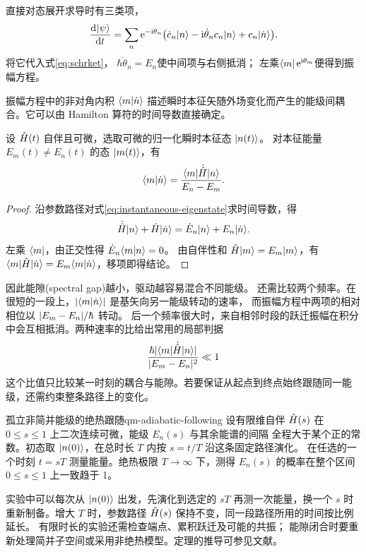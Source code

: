 直接对态展开求导时有三类项，
\[
    \frac{\mathop{}\!\mathrm{d}^{}\lvert\psi\rangle}{\mathrm{d}{t}^{}}
    = \sum_n\mathop{}\!\mathrm{e}^{-\mathrm{i}\theta_n}
    \bigl(\dot c_n\lvert n\rangle - \mathrm{i}\dot\theta_n c_n\lvert n\rangle + c_n\lvert\dot n\rangle\bigr).
\]
将它代入式\eqref{eq:schrket}，
$\hbar\dot\theta_n = E_n$使中间项与右侧抵消；
左乘$\langle m\rvert\mathop{}\!\mathrm{e}^{\mathrm{i}\theta_m}$便得到振幅方程。

振幅方程中的非对角内积 $\langle m\vert\dot n\rangle$ 描述瞬时本征矢随外场变化而产生的能级间耦合。它可以由 Hamilton 算符的时间导数直接确定。
\begin{lemma}[不同能级之间的导数耦合]
    设 $\hat{H}(t)$ 自伴且可微，选取可微的归一化瞬时本征态 $\lvert n(t)\rangle$。
    对本征能量 $E_m(t) \ne E_n(t)$ 的态 $\lvert m(t)\rangle$，有
    \begin{equation}
        \langle m\vert\dot n\rangle = \frac{\langle m\vert\dot{\hat{H}}\vert n\rangle}{E_n - E_m}.
    \end{equation}
\end{lemma}
\begin{proof}
    沿参数路径对式\eqref{eq:instantaneous-eigenstate}求时间导数，得
    \[
        \dot{\hat{H}}\lvert n\rangle + \hat{H}\lvert\dot n\rangle
            = \dot E_n\lvert n\rangle + E_n\lvert\dot n\rangle.
    \]
    左乘 $\langle m\rvert$，由正交性得 $\dot E_n\langle m\vert n\rangle = 0$。
    由自伴性和 $\hat{H}\lvert m\rangle = E_m\lvert m\rangle$，有 $\langle m\vert\hat{H}\vert\dot n\rangle = E_m\langle m\vert\dot n\rangle$，移项即得结论。
\end{proof}

因此能隙(spectral gap)越小，驱动越容易混合不同能级。
还需比较两个频率。在很短的一段上，$\lvert\langle m\vert\dot n\rangle\rvert$ 是基矢向另一能级转动的速率，
而振幅方程中两项的相对相位以 $\lvert E_m - E_n\rvert/\hbar$ 转动。
后一个频率很大时，来自相邻时段的跃迁振幅在积分中会互相抵消。两种速率的比给出常用的局部判据
\begin{equation}
    \frac{\hbar\lvert\langle m\vert\dot{\hat{H}}\vert n\rangle\rvert}{\lvert E_m - E_n\rvert^2} \ll 1
    \label{eq:adiabaticcriterion}
\end{equation}
这个比值只比较某一时刻的耦合与能隙。若要保证从起点到终点始终跟随同一能级，还需约束整条路径上的变化。
\begin{theorem}{孤立非简并能级的绝热跟随}{qm-adiabatic-following}
    设有限维自伴 $\hat{H}(s)$ 在 $0 \le s \le 1$ 上二次连续可微，能级 $E_n(s)$ 与其余能谱的间隔
    全程大于某个正的常数。初态取 $\lvert n(0)\rangle$，在总时长 $T$ 内按 $s = t/T$ 沿这条固定路径演化。
    在任选的一个时刻 $t = sT$ 测量能量。绝热极限 $T \to \infty$ 下，测得 $E_n(s)$ 的概率在整个区间 $0 \le s \le 1$ 上一致趋于 1。
\end{theorem}
实验中可以每次从 $\lvert n(0)\rangle$ 出发，先演化到选定的 $sT$ 再测一次能量，换一个 $s$ 时重新制备。增大 $T$ 时，参数路径 $\hat{H}(s)$ 保持不变，同一段路径所用的时间按比例延长。
有限时长的实验还需检查端点、累积跃迁及可能的共振；
能隙闭合时要重新处理简并子空间或采用非绝热模型。定理的推导可参见文献\cite{mitadiabatic}。

